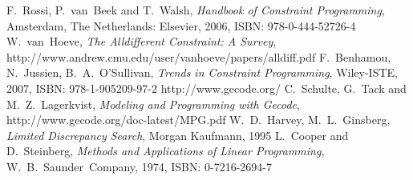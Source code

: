 \documentclass[10pt,
               a4paper,
               journal,
               ]{IEEEtran}
\begin{document}
	\begin{thebibliography}{1}
		F.~Rossi, P.~van~Beek and T.~Walsh, \emph{Handbook of Constraint Programming}, Amsterdam, The Netherlands: Elsevier, 2006, ISBN: 978-0-444-52726-4
		W.~van~Hoeve, \emph{The Alldifferent Constraint: A Survey}, http://www.andrew.cmu.edu/user/vanhoeve/papers/alldiff.pdf
		F.~Benhamou, N.~Jussien, B.~A.~O'Sullivan, \emph{Trends in Constraint Programming}, Wiley-ISTE, 2007, ISBN: 978-1-905209-97-2
		http://www.gecode.org/
		C.~Schulte, G.~Tack and M.~Z.~Lagerkvist, \emph{Modeling and Programming with Gecode}, http://www.gecode.org/doc-latest/MPG.pdf
		W.~D.~Harvey, M.~L.~Ginsberg, \emph{Limited Discrepancy Search}, Morgan Kaufmann, 1995
		L.~Cooper and D.~Steinberg, \emph{Methods and Applications of Linear Programming}, W.~B.~Saunder~Company, 1974, ISBN: 0-7216-2694-7
	\end{thebibliography}
\end{document}
